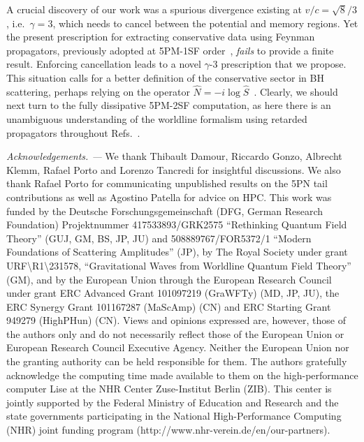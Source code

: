 \documentclass[twocolumn,superscriptaddress,amsmath, amssymb, amsfonts,preprintnumbers,aps,prd,longbibliography,nofootinbib]{revtex4-2}
\renewcommand{\sec}[1]{\textit{#1. --- }}
\def\Rcites#1{Refs.~\cite{#1}}
\begin{document}
{A crucial discovery of our work was a spurious divergence
existing at $v/c=\sqrt{8}/3$, i.e.~$\gamma=3$,
which} needs to cancel between the potential and memory regions.
Yet the present prescription for extracting conservative data
using Feynman propagators,
{previously adopted at 5PM-1SF order~\cite{Driesse:2024xad},}
\emph{fails} to provide a finite result.
Enforcing {cancellation} leads to a novel $\gamma$-3 prescription that we propose.
This situation calls for a {better} definition of the conservative sector in BH scattering, perhaps relying on the operator $\hat{N}=-i\log\hat{S}$~\cite{Damgaard:2021ipf, Damgaard:2023ttc, Kim:2024svw, Alessio:2025flu, Kim:2025gis, Haddad:2025cmw, Brandhuber:2025igz}. Clearly, we should next turn to the fully dissipative 5PM-2SF computation, as here there is an unambiguous understanding of the worldline formalism using retarded propagators throughout \Rcites{Jakobsen:2022psy, Kalin:2022hph}.



\sec{Acknowledgements}
We thank Thibault Damour, Riccardo Gonzo, Albrecht Klemm, Rafael Porto and Lorenzo Tancredi for insightful discussions.
We also thank Rafael Porto for communicating unpublished results on the 5PN tail contributions as well as
Agostino Patella for advice on HPC.
This work was funded by the Deutsche Forschungsgemeinschaft
(DFG, German Research Foundation)
Projektnummer 417533893/GRK2575 ``Rethinking Quantum Field Theory'' (GUJ, GM, BS, JP, JU)
and 508889767/FOR5372/1 ``Modern Foundations of Scattering Amplitudes'' (JP),
by The Royal Society under grant URF\textbackslash R1\textbackslash 231578,
``Gravitational Waves from Worldline Quantum Field Theory'' (GM),
and by the European Union through the
European Research Council under grant ERC Advanced Grant 101097219 (GraWFTy) (MD, JP, JU),
the ERC Synergy Grant 101167287 (MaScAmp) (CN)
 and ERC Starting Grant 949279 (HighPHun) (CN).
Views and opinions expressed are, however, those of the authors only and do not necessarily reflect those of the European Union or European Research Council Executive Agency. Neither the European Union nor the granting authority can be held responsible for them.
The authors gratefully acknowledge the computing time made available to them on the
high-performance computer Lise at the NHR Center Zuse-Institut Berlin (ZIB). This center is jointly supported by the Federal Ministry of Education and Research and the state governments participating in the National High-Performance Computing (NHR) joint funding program
(http://www.nhr-verein.de/en/our-partners).
\end{document}

